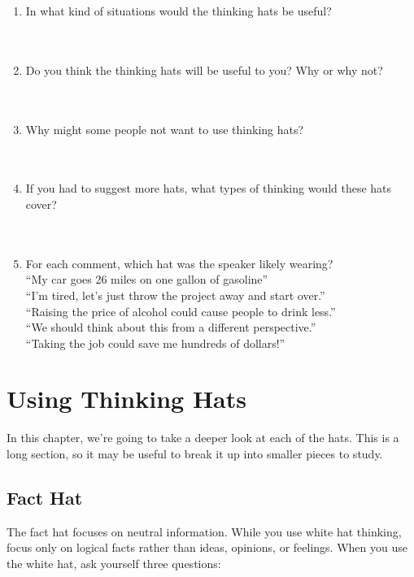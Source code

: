 \begin{enumerate}
	\item In what kind of situations would the thinking hats be useful? ~\\~\\~\\
	\item Do you think the thinking hats will be useful to you? Why or why not? ~\\~\\~\\
	\item Why might some people not want to use thinking hats? ~\\~\\~\\
	\item If you had to suggest more hats, what types of thinking would these hats cover? ~\\~\\~\\
	\item For each comment, which hat was the speaker likely wearing? \\
		``My car goes 26 miles on one gallon of gasoline'' \\
		``I'm tired, let's just throw the project away and start over.'' \\
		``Raising the price of alcohol could cause people to drink less.'' \\
		``We should think about this from a different perspective.'' \\
		``Taking the job could save me hundreds of dollars!''
\end{enumerate}

\chapter{Using Thinking Hats}


In this chapter, we're going to take a deeper look at each of the hats. This is a long section, so it may be useful to break it up into smaller pieces to study.

\section*{Fact Hat}

The fact hat focuses on neutral information. While you use white hat thinking, focus only on logical facts rather than ideas, opinions, or feelings. When you use the white hat, ask yourself three questions:

